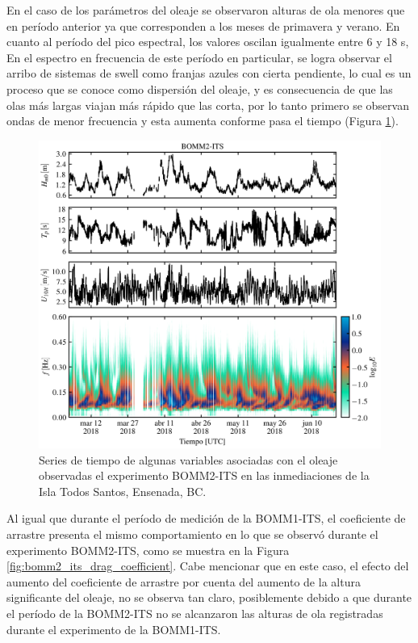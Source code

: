 \documentclass[11pt]{article}
\begin{document}
En el caso de los parámetros del oleaje se observaron alturas de ola menores que
en período anterior ya que corresponden a los meses de primavera y verano. En
cuanto al período del pico espectral, los valores oscilan igualmente entre 6 y
18 s, En el espectro en frecuencia de este período en particular, se logra
observar el arribo de sistemas de swell como franjas azules con cierta
pendiente, lo cual es un proceso que se conoce como dispersión del oleaje, y es
consecuencia de que las olas más largas viajan más rápido que las corta, por lo
tanto primero se observan ondas de menor frecuencia y esta aumenta conforme pasa
el tiempo (Figura \ref{fig:bomm2_its_wave_parameters}).

\begin{figure}[htpb]
  \centering
  \includegraphics[width=0.85\linewidth]{../figures/bomm2_its_wave_parameters.png}
  \caption{
    Series de tiempo de algunas variables asociadas con el oleaje observadas el
    experimento BOMM2-ITS en las inmediaciones de la Isla Todos Santos,
    Ensenada, BC.
  }
  \label{fig:bomm2_its_wave_parameters}
\end{figure}

Al igual que durante el período de medición de la BOMM1-ITS, el coeficiente de
arrastre presenta el mismo comportamiento en lo que se observó durante el
experimento BOMM2-ITS, como se muestra en la Figura
\ref{fig:bomm2_its_drag_coefficient}. Cabe mencionar que en este caso, el efecto
del aumento del coeficiente de arrastre por cuenta del aumento de la altura
significante del oleaje, no se observa tan claro, posiblemente debido a que
durante el período de la BOMM2-ITS no se alcanzaron las alturas de ola
registradas durante el experimento de la BOMM1-ITS.
\end{document}
